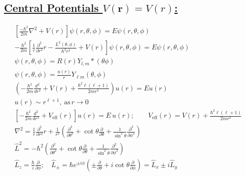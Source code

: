 \documentclass[a4paper,12pt]{article}
\begin{document}
\subsection*{\underline{Central Potentials $V(\mathbf{r})=V(r)$:}}
\begin{gather}
    \left[ \frac{-\hbar^2}{2m}\nabla^2+V(r) \right]\psi(r,\theta,\phi)=E\psi(r,\theta,\phi)\\
    -\frac{\hbar^2}{2m}\left[ \frac{1}{r}\frac{\partial^2}{\partial r^2}r- \frac{L^2(\theta,\phi)}{\hbar^2r^2}+V(r)\right]\psi(r,\theta,\phi)=E\psi(r,\theta,\phi)\\
    \psi(r, \theta, \phi)=R(r)Y_{l,m}*(\theta\phi)\\
    \psi(r, \theta, \phi)=\frac{u(r)}{r} Y_{\ell m}(\theta, \phi)\\
    \left(-\frac{\hbar^{2}}{2 m} \frac{d^{2}}{d r^{2}}+V(r)+\frac{\hbar^{2} \ell(\ell+1)}{2 m r^{2}}\right) u(r)=E u(r)\\
    u(r) \sim r^{\ell+1},\ \text{as} \, r \rightarrow 0 \\
    \left[ -\frac{\hbar^2}{2m} \frac{d^2}{dr^2} + V_{\text{eff}}(r) \right] u(r) = E\, u(r); \qquad V_{\text{eff}}(r) = V(r) + \frac{\hbar^2 \ell (\ell +1)}{2m r^2} \\
    \nabla^{2}=\frac{1}{r} \frac{\partial^{2}}{\partial r^{2}} r+\frac{1}{r^{2}}\left(\frac{\partial^{2}}{\partial \theta^{2}}+\cot \theta \frac{\partial}{\partial \theta}+\frac{1}{\sin ^{2} \theta} \frac{\partial^{2}}{\partial \phi^{2}}\right) \\
    \hat{L}^{2}=-\hbar^{2}\left(\frac{\partial^{2}}{\partial \theta^{2}}+\cot \theta \frac{\partial}{\partial \theta}+\frac{1}{\sin ^{2} \theta} \frac{\partial^{2}}{\partial \phi^{2}}\right) \\
    \hat{L}_{z}=\frac{\hbar}{i} \frac{\partial}{\partial \phi} ; \quad \hat{L}_{\pm}=\hbar e^{\pm i \phi}\left(\pm \frac{\partial}{\partial \theta}+i \cot \theta \frac{\partial}{\partial \phi}\right)=\hat{L}_{x}\pm i\hat{L}_{y}
\end{gather}
\end{document}
